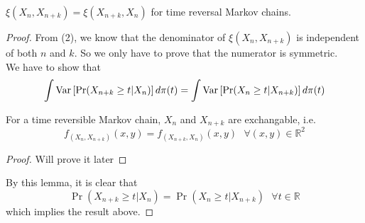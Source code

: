 \begin{theorem}
    $\xi(X_n, X_{n+k}) = \xi(X_{n+k}, X_n)$ for time reversal Markov chains.
    \begin{proof}
        From (2), we know that the denominator of $\xi(X_n, X_{n+k})$ is independent of both $n$ and $k$. So we only have to prove that the numerator is symmetric. \\
        We have to show that
        \begin{equation*}
            \int \text{Var}\left[{{\Pr (X_{n+k} \geq t | X_n)}}\right] d\pi(t) = \int \text{Var}\left[{{\Pr (X_n \geq t | X_{n+k})}}\right] d\pi(t)
        \end{equation*}
        \begin{lem}
            For a time reversible Markov chain, $X_n$ and $X_{n+k}$ are exchangable, i.e.
            \begin{equation*}
                f_{(X_{n}, X_{n+k})}(x, y) = f_{(X_{n+k}, X_{n})}(x, y) \text{  } \forall (x, y) \in \mathbb{R}^2
            \end{equation*}
            \begin{proof}
                Will prove it later
            \end{proof}
        \end{lem}
        By this lemma, it is clear that
        \begin{equation*}
            \Pr (X_{n+k} \geq t | X_n) = \Pr (X_n \geq t | X_{n+k}) \text{  } \forall t \in \mathbb{R}
        \end{equation*}
        which implies the result above.
    \end{proof}
\end{theorem}
    \newpage


